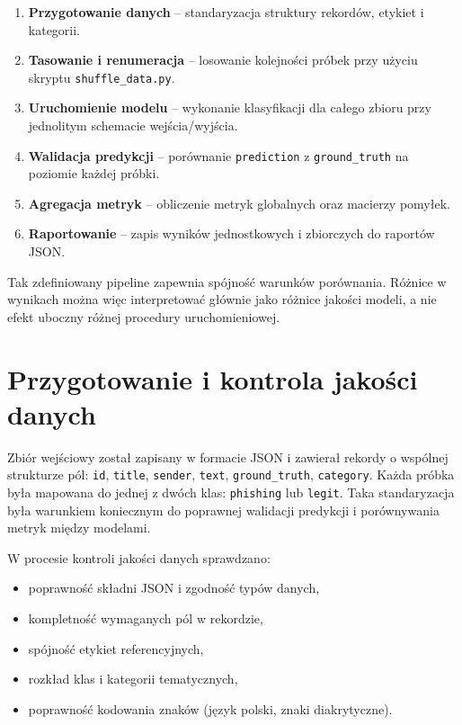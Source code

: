 \documentclass[12pt,a4paper,openright]{report}
\begin{document}
\begin{enumerate}
    \item \textbf{Przygotowanie danych} -- standaryzacja struktury rekordów, etykiet i kategorii.
    \item \textbf{Tasowanie i renumeracja} -- losowanie kolejności próbek przy użyciu skryptu \texttt{shuffle\_data.py}.
    \item \textbf{Uruchomienie modelu} -- wykonanie klasyfikacji dla całego zbioru przy jednolitym schemacie wejścia/wyjścia.
    \item \textbf{Walidacja predykcji} -- porównanie \texttt{prediction} z \texttt{ground\_truth} na poziomie każdej próbki.
    \item \textbf{Agregacja metryk} -- obliczenie metryk globalnych oraz macierzy pomyłek.
    \item \textbf{Raportowanie} -- zapis wyników jednostkowych i zbiorczych do raportów JSON.
\end{enumerate}

Tak zdefiniowany pipeline zapewnia spójność warunków porównania. Różnice w wynikach można więc interpretować głównie jako różnice jakości modeli, a nie efekt uboczny różnej procedury uruchomieniowej.

\section{Przygotowanie i kontrola jakości danych}

Zbiór wejściowy został zapisany w formacie JSON i zawierał rekordy o wspólnej strukturze pól: \texttt{id}, \texttt{title}, \texttt{sender}, \texttt{text}, \texttt{ground\_truth}, \texttt{category}. Każda próbka była mapowana do jednej z dwóch klas: \texttt{phishing} lub \texttt{legit}. Taka standaryzacja była warunkiem koniecznym do poprawnej walidacji predykcji i porównywania metryk między modelami.

W procesie kontroli jakości danych sprawdzano:

\begin{itemize}
    \item poprawność składni JSON i zgodność typów danych,
    \item kompletność wymaganych pól w rekordzie,
    \item spójność etykiet referencyjnych,
    \item rozkład klas i kategorii tematycznych,
    \item poprawność kodowania znaków (język polski, znaki diakrytyczne).
\end{itemize}
\end{document}
